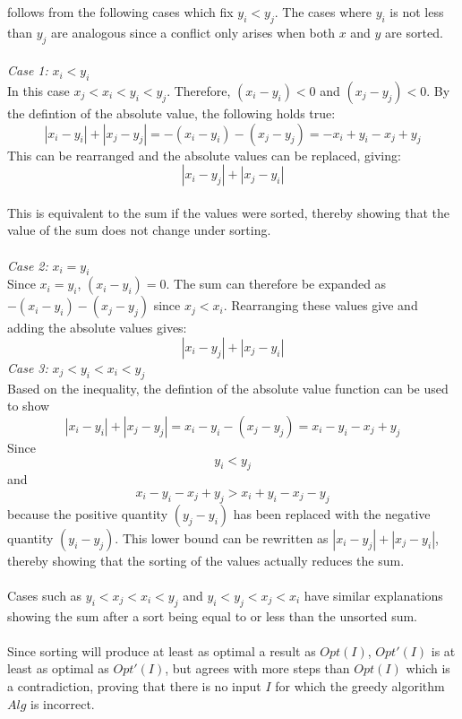 \documentclass[12pt]{article}
\begin{document}
follows from the following cases which fix $y_i < y_j$.  The cases where
$y_i$ is not less than $y_j$ are analogous since a conflict only arises when both $x$ and $y$
are sorted.\\\\
\textit{Case 1:} $x_i < y_i$\\
In this case $x_j < x_i < y_i < y_j$.  Therefore, $(x_i - y_i) < 0$
and $(x_j - y_j) < 0$.  By the defintion of the absolute value, the following holds
true:
\[
|x_i - y_i| + |x_j - y_j| = -(x_i - y_i) - (x_j - y_j) = -x_i + y_i - x_j + y_j
\]
This can be rearranged and the absolute values can be replaced, giving:\\ 
\[|x_i - y_j| + |x_j - y_i|\]\\
This is equivalent to the sum if the values were sorted, thereby showing that the value
of the sum does not change under sorting.\\\\
\textit{Case 2:} $x_i = y_i$\\
Since $x_i = y_i$, $(x_i - y_i) = 0$. The sum can therefore be expanded as
$-(x_i - y_i) - (x_j - y_j)$ since $x_j < x_i$.  Rearranging these values
give and adding the absolute values gives: \[|x_i - y_j| + |x_j - y_i|\] 
\textit{Case 3:} $x_j < y_i < x_i < y_j$\\
Based on the inequality, the defintion of the absolute value function can be used to show
\[
|x_i - y_i| + |x_j - y_j| = x_i - y_i - (x_j - y_j) = x_i - y_i - x_j + y_j
\]
Since 
\[y_i < y_j\] and \[x_i - y_i - x_j + y_j > x_i + y_i - x_j - y_j\] because the positive quantity
$(y_j - y_i)$ has been replaced with the negative quantity $(y_i - y_j)$.  This lower bound
can be rewritten as $|x_i - y_j| + |x_j - y_i|$, thereby showing that the sorting of the
values actually reduces the sum.\\\\
Cases such as $y_i < x_j < x_i < y_j$ and $y_i < y_j < x_j < x_i$ have similar explanations
showing the sum after a sort being equal to or less than the unsorted sum.\\\\
Since sorting will produce at least as optimal a result as $Opt(I)$, $Opt'(I)$ is at least
as optimal as $Opt'(I)$, but agrees with more steps than $Opt(I)$ which is a contradiction,
proving that there is no input $I$ for which the greedy algorithm $Alg$ is incorrect.     
\end{document}
